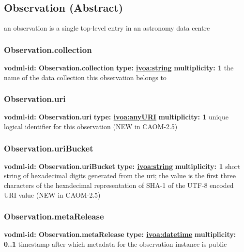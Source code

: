  \subsection{Observation (Abstract)}
  \label{sect:Observation}
    an observation is a single top-level entry in an astronomy data centre

    \subsubsection{Observation.collection}
      \textbf{vodml-id: Observation.collection} \newline
      \textbf{type: \hyperref[sect:ivoa]{ivoa:string}} \newline
      \textbf{multiplicity: 1} \newline
      the name of the data collection this observation belongs to

    \subsubsection{Observation.uri}
      \textbf{vodml-id: Observation.uri} \newline
      \textbf{type: \hyperref[sect:ivoa]{ivoa:anyURI}} \newline
      \textbf{multiplicity: 1} \newline
      unique logical identifier for this observation (NEW in CAOM-2.5)

    \subsubsection{Observation.uriBucket}
      \textbf{vodml-id: Observation.uriBucket} \newline
      \textbf{type: \hyperref[sect:ivoa]{ivoa:string}} \newline
      \textbf{multiplicity: 1} \newline
      short string of hexadecimal digits generated from the uri; the value is the first three characters of the hexadecimal representation of SHA-1 of the UTF-8 encoded URI value (NEW in CAOM-2.5)

    \subsubsection{Observation.metaRelease}
      \textbf{vodml-id: Observation.metaRelease} \newline
      \textbf{type: \hyperref[sect:ivoa]{ivoa:datetime}} \newline
      \textbf{multiplicity: 0..1} \newline
      timestamp after which metadata for the observation instance is public

